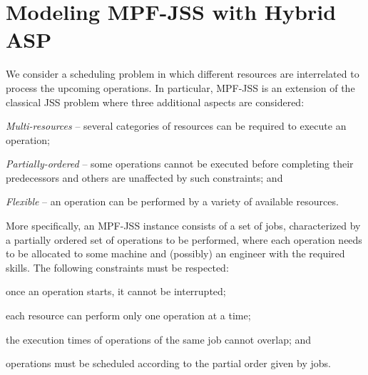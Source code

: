 \documentclass[submission,copyright,creativecommons]{eptcs}
\begin{document}
\section{Modeling MPF-JSS with Hybrid ASP}\label{sec:aspmodeling}
We consider a scheduling problem in which different resources are interrelated to process the upcoming operations. In particular, MPF-JSS is an extension of the classical JSS problem where three additional aspects are considered: 
\begin{enumerate*}[label=\emph{(\alph*)}]
	\item \emph{Multi-resources} -- several categories of resources can be required to execute an operation; 
	\item \emph{Partially-ordered} -- some operations cannot be executed before completing their predecessors and others are unaffected by such constraints; and
	\item \emph{Flexible} -- an operation can be performed by a variety of available resources. 
\end{enumerate*}
More specifically, an MPF-JSS instance consists of a set of jobs,
characterized by a partially ordered set of operations to be performed,
where each operation needs to be allocated to some machine and (possibly) an
engineer with the required skills.
The following constraints must be respected:
\begin{enumerate*}[label=\emph{(\roman*)}]
  \item once an operation starts, it cannot be interrupted;
  \item each resource can perform only one operation at a time; 
  \item the execution times of operations of the same job cannot overlap; and
  \item operations must be scheduled according to the partial order given by jobs. %
\end{enumerate*}



\end{document}
